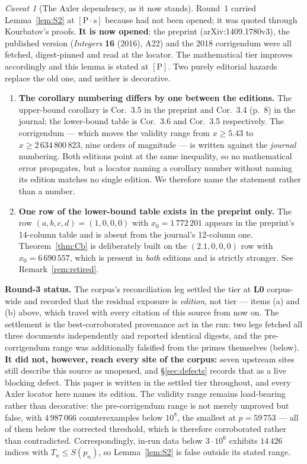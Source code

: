 \documentclass[11pt,a4paper]{article}
\theoremstyle{plain}
\theoremstyle{definition}
\theoremstyle{remark}
\newtheorem{hazard}[theorem]{Caveat}
\newcommand{\cP}{{[\mathrm{P}]}}
\newcommand{\cPs}{{[\mathrm{P}\!\cdot\!\mathrm{s}]}}
\begin{document}
\begin{hazard}[The Axler dependency, as it now stands]
\label{haz:axler}
Round~1 carried Lemma~\ref{lem:S2} at $\cPs$ because \cite{axler2014newbounds} had not been
opened; it was quoted through Kourbatov's proofs. \textbf{It is now opened}: the preprint
(arXiv:1409.1780v3), the published version (\emph{Integers} \textbf{16} (2016), A22) and the
2018 corrigendum were all fetched, digest-pinned and read at the locator. The mathematical
tier improves accordingly and this lemma is stated at $\cP$. Two purely editorial hazards
replace the old one, and neither is decorative.
\begin{enumerate}
\item[\textup{(a)}] \textbf{The corollary numbering differs by one between the editions.} The
  upper-bound corollary is Cor.~3.5 in the preprint and Cor.~3.4 (p.~8) in the journal; the
  lower-bound table is Cor.~3.6 and Cor.~3.5 respectively. The corrigendum --- which moves the
  validity range from $x \ge 5.43$ to $x \ge 2\,634\,800\,823$, nine orders of magnitude ---
  is written against the \emph{journal} numbering. Both editions point at the same inequality,
  so no mathematical error propagates, but a locator naming a corollary number without naming
  its edition matches no single edition. We therefore name the statement rather than a number.
\item[\textup{(b)}] \textbf{One row of the lower-bound table exists in the preprint only.} The
  row $(a,b,c,d) = (1,0,0,0)$ with $x_0 = 1\,772\,201$ appears in the preprint's 14-column
  table and is absent from the journal's 12-column one. Theorem~\ref{thm:Cb} is deliberately
  built on the $(2.1,0,0,0)$ row with $x_0 = 6\,690\,557$, which is present in \emph{both}
  editions and is strictly stronger. See Remark~\ref{rem:retired}.
\end{enumerate}
\textbf{Round-3 status.} The corpus's reconciliation leg settled the tier at \textbf{L0}
corpus-wide and recorded that the residual exposure is \emph{edition}, not tier --- items (a)
and (b) above, which travel with every citation of this source from now on. The settlement is
the best-corroborated provenance act in the run: two legs fetched all three documents
independently and reported identical digests, and the pre-corrigendum range was additionally
falsified from the primes themselves (below). \textbf{It did not, however, reach every site of
the corpus:} seven upstream sites still describe this source as unopened, and
\S\ref{sec:defects} records that as a live blocking defect. This paper is written in the
settled tier throughout, and every Axler locator here names its edition.
The validity range remains load-bearing rather than decorative: the pre-corrigendum range is
not merely unproved but false, with $4\,987\,066$ counterexamples below $10^8$, the smallest at
$p = 59\,753$ --- all of them below the corrected threshold, which is therefore corroborated
rather than contradicted. Correspondingly, in-run data below $3\cdot10^6$ exhibits $14\,426$
indices with $T_n \le S(p_n)$, so Lemma~\ref{lem:S2} is false outside its stated range.
\end{hazard}
\end{document}
